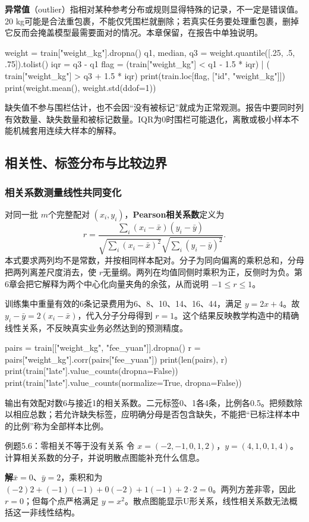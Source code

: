 \documentclass[UTF8,fontset=none,zihao=-4,a4paper]{ctexart}
\newcommand{\term}[1]{\textbf{#1}}
\newcommand{\sol}{\par\noindent\textbf{解}\quad}
\newcommand{\code}[1]{\texttt{\detokenize{#1}}}
\numberwithin{equation}{section}
\numberwithin{figure}{section}
\begin{document}
\term{异常值}（outlier）指相对某种参考分布或规则显得特殊的记录，不一定是错误值。20 kg可能是合法重包裹，不能仅凭围栏就删除；若真实任务要处理重包裹，删掉它反而会掩盖模型最需要面对的情况。本章保留\code{t08}，在报告中单独说明。

\begin{pycode}
weight = train["weight_kg"].dropna()
q1, median, q3 = weight.quantile([.25, .5, .75]).tolist()
iqr = q3 - q1
flag = (train["weight_kg"] < q1 - 1.5 * iqr) | (
        train["weight_kg"] > q3 + 1.5 * iqr)
print(train.loc[flag, ["id", "weight_kg"]])
print(weight.mean(), weight.std(ddof=1))
\end{pycode}
缺失值不参与围栏估计，也不会因“没有被标记”就成为正常观测。报告中要同时列有效数量、缺失数量和被标记数量。IQR为0时围栏可能退化，离散或极小样本不能机械套用连续大样本的解释。

\subsection{相关性、标签分布与比较边界}
\subsubsection{相关系数测量线性共同变化}
对同一批 $m$个完整配对 $(x_i,y_i)$，\term{Pearson相关系数}定义为
\[
 r=\frac{\sum_i(x_i-\bar x)(y_i-\bar y)}
 {\sqrt{\sum_i(x_i-\bar x)^2}\sqrt{\sum_i(y_i-\bar y)^2}}.
\]
本式要求两列均不是常数，并按相同样本配对。分子为同向偏离的乘积总和，分母把两列离差尺度消去，使 $r$无量纲。两列在均值同侧时乘积为正，反侧时为负。第6章会把它解释为两个中心化向量夹角的余弦，从而说明 $-1\le r\le1$。

训练集中重量有效的6条记录费用为6、8、10、14、16、44，满足 $y=2x+4$。故 $y_i-\bar y=2(x_i-\bar x)$，代入分子分母得到 $r=1$。这个结果反映教学构造中的精确线性关系，不反映真实业务必然达到的预测精度。
\begin{pycode}
pairs = train[["weight_kg", "fee_yuan"]].dropna()
r = pairs["weight_kg"].corr(pairs["fee_yuan"])
print(len(pairs), r)
print(train["late"].value_counts(dropna=False))
print(train["late"].value_counts(normalize=True, dropna=False))
\end{pycode}
输出有效配对数6与接近1的相关系数。二元标签0、1各4条，比例各0.5。\code{normalize=True}把频数除以相应总数；若允许缺失标签，应明确分母是否包含缺失，不能把“已标注样本中的比例”称为全部样本比例。

\begin{infobox}{例题5.6：零相关不等于没有关系}
令 $x=(-2,-1,0,1,2)$，$y=(4,1,0,1,4)$。计算相关系数的分子，并说明散点图能补充什么信息。
\end{infobox}
\sol $\bar x=0$、$\bar y=2$，乘积和为 $(-2)2+(-1)(-1)+0(-2)+1(-1)+2\cdot2=0$。两列方差非零，因此 $r=0$；但每个点严格满足 $y=x^2$。散点图能显示U形关系，线性相关系数无法概括这一非线性结构。
\end{document}
